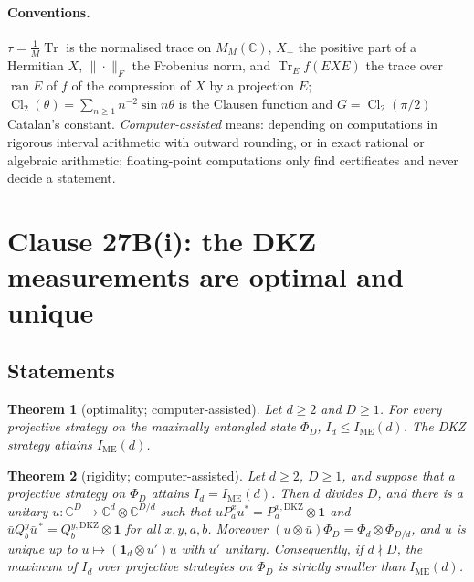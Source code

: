 \documentclass[11pt]{article}
\newtheorem{theorem}{Theorem}
\theoremstyle{remark}
\numberwithin{equation}{section}
\newcommand{\C}{\mathbb{C}}
\newcommand{\Tr}{\operatorname{Tr}}
\newcommand{\Cl}{\operatorname{Cl}_2}
\newcommand{\IME}{I_{\mathrm{ME}}}
\newcommand{\one}{\mathbf{1}}
\newcommand{\DKZ}{\mathrm{DKZ}}
\begin{document}
\paragraph{Conventions.}
$\tau=\frac1M\Tr$ is the normalised trace on $M_M(\C)$, $X_+$ the positive part of a Hermitian $X$, $\|\cdot\|_F$ the
Frobenius norm, and $\Tr_Ef(EXE)$ the trace over $\operatorname{ran}E$ of $f$ of the compression of $X$ by a projection
$E$; $\Cl(\theta)=\sum_{n\ge1}n^{-2}\sin n\theta$ is the Clausen function and $G=\Cl(\pi/2)$ Catalan's constant.
\emph{Computer-assisted} means: depending on computations in rigorous interval arithmetic with outward rounding, or in
exact rational or algebraic arithmetic; floating-point computations only find certificates and never decide a statement.

\section{Clause 27B(i): the DKZ measurements are optimal and unique}\label{sec:27Bi}

\subsection{Statements}\label{subsec:statements}

\begin{theorem}[optimality; computer-assisted]\label{thm:opt}
Let $d\ge2$ and $D\ge1$. For every projective strategy on the maximally entangled state $\Phi_D$, $I_d\le\IME(d)$. The
DKZ strategy attains $\IME(d)$.
\end{theorem}

\begin{theorem}[rigidity; computer-assisted]\label{thm:rig}
Let $d\ge2$, $D\ge1$, and suppose that a projective strategy on $\Phi_D$ attains $I_d=\IME(d)$. Then $d$ divides $D$,
and there is a unitary $u\colon\C^D\to\C^d\otimes\C^{D/d}$ such that $uP^x_au^*=P^{x,\DKZ}_a\otimes\one$ and
$\bar uQ^y_b\bar u^{\,*}=Q^{y,\DKZ}_b\otimes\one$ for all $x,y,a,b$. Moreover $(u\otimes\bar u)\Phi_D=\Phi_d\otimes\Phi_{D/d}$,
and $u$ is unique up to $u\mapsto(\one_d\otimes u')u$ with $u'$ unitary. Consequently, if $d\nmid D$, the maximum of
$I_d$ over projective strategies on $\Phi_D$ is strictly smaller than $\IME(d)$.
\end{theorem}
\end{document}
